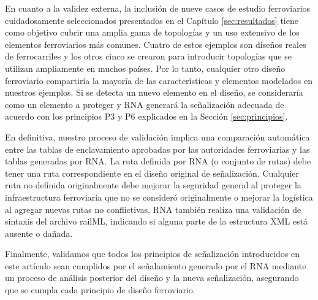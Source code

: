     En cuanto a la validez externa, la inclusión de nueve casos de estudio ferroviarios cuidadosamente seleccionados presentados en el Capítulo \ref{sec:resultados} tiene como objetivo cubrir una amplia gama de topologías y un uso extensivo de los elementos ferroviarios más comunes. Cuatro de estos ejemplos son diseños reales de ferrocarriles y los otros cinco se crearon para introducir topologías que se utilizan ampliamente en muchos países. Por lo tanto, cualquier otro diseño ferroviario compartiría la mayoría de las características y elementos modelados en nuestros ejemplos. Si se detecta un nuevo elemento en el diseño, se consideraría como un elemento a proteger y RNA generará la señalización adecuada de acuerdo con los principios P3 y P6 explicados en la Sección \ref{sec:principios}.

    En definitiva, nuestro proceso de validación implica una comparación automática entre las tablas de enclavamiento aprobadas por las autoridades ferroviarias y las tablas generadas por RNA. La ruta definida por RNA (o conjunto de rutas) debe tener una ruta correspondiente en el diseño original de señalización. Cualquier ruta no definida originalmente debe mejorar la seguridad general al proteger la infraestructura ferroviaria que no se consideró originalmente o mejorar la logística al agregar nuevas rutas no conflictivas. RNA también realiza una validación de sintaxis del archivo railML, indicando si alguna parte de la estructura XML está ausente o dañada. 
    
    Finalmente, validamos que todos los principios de señalización introducidos en este artículo sean cumplidos por el señalamiento generado por el RNA mediante un proceso de análisis posterior del diseño y la nueva señalización, asegurando que se cumpla cada principio de diseño ferroviario.